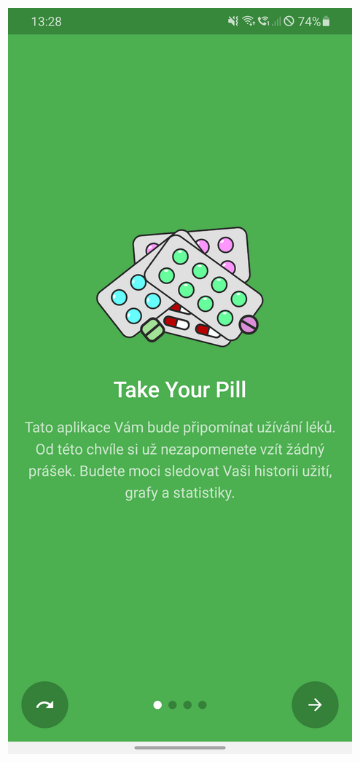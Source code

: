 \documentclass[../TakeYourPill.tex]{subfiles}
\begin{document}
\newpage

\begin{figure}[ht]
  \vfill
  \hfill
  \begin{subfigure}[b]{.3\textwidth}
    \centering
    \includegraphics[width=\textwidth]{app-intro-screenshot}

\end{subfigure}
\end{figure}
\end{document}
